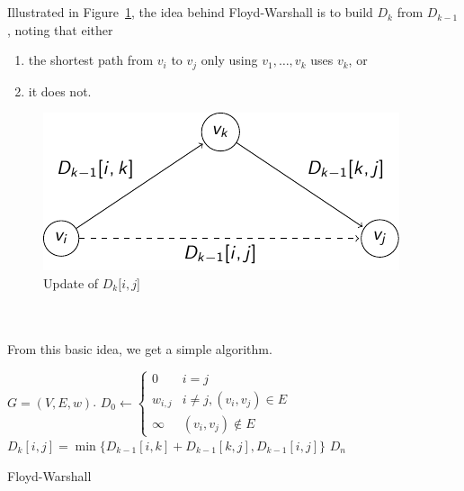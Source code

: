         \pagebreak
        \vphantom
        \\
        \\
        Illustrated in Figure~\ref{fig:floyd-warshall-table-update}, the idea behind Floyd-Warshall is to build \(D_k\) from \(D_{k-1}\), noting that either
        \begin{enumerate}
            \item the shortest path from \(v_i\) to \(v_j\) only using \(v_1,\ldots,v_k\) uses \(v_k\), or 
            \item it does not.
        \end{enumerate}
        \begin{figure}[H]
            \begin{center}
                \includegraphics{Graphics/Figures/floyd_warshall/table_update.pdf}
            \end{center}
            \caption{Update of \(D_k[i,j\)]}
            \label{fig:floyd-warshall-table-update}
        \end{figure}
        \vphantom
        \\
        \\
        From this basic idea, we get a simple algorithm.
        \begin{algorithm}[H] 
            \begin{algorithmic}[1]
                \Require \(G=(V,E,w)\).
                    \State \(D_0\gets\begin{cases}
                        0 & i=j \\
                        w_{i,j} & i\neq j, (v_i,v_j)\in E \\
                        \infty & (v_i,v_j)\nin E
                    \end{cases}\)
                                \State \(D_{k}[i,j]=\min\{D_{k-1}[i,k]+D_{k-1}[k,j], D_{k-1}[i,j]\}\)
                            \EndFor
                        \EndFor
                    \EndFor
                    \State \Return \(D_n\)
                \EndProcedure 
            \end{algorithmic}
            \caption{Floyd-Warshall}
            \label{alg:floydwarshall}
        \end{algorithm}
